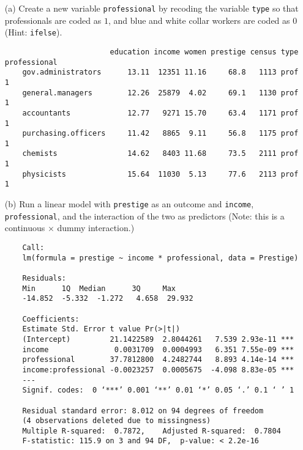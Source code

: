\documentclass[12pt,letterpaper]{article}
\begin{document}
\newpage
\begin{enumerate}
	
	\item [(a)]
	Create a new variable \texttt{professional} by recoding the variable \texttt{type} so that professionals are coded as $1$, and blue and white collar workers are coded as $0$ (Hint: \texttt{ifelse}).
		 
	\begin{verbatim}
	                    education income women prestige census type professional
	gov.administrators      13.11  12351 11.16     68.8   1113 prof            1
	general.managers        12.26  25879  4.02     69.1   1130 prof            1
	accountants             12.77   9271 15.70     63.4   1171 prof            1
	purchasing.officers     11.42   8865  9.11     56.8   1175 prof            1
	chemists                14.62   8403 11.68     73.5   2111 prof            1
	physicists              15.64  11030  5.13     77.6   2113 prof            1
\end{verbatim}  
		\vspace{4cm}
	
	\item [(b)]
	Run a linear model with \texttt{prestige} as an outcome and \texttt{income}, \texttt{professional}, and the interaction of the two as predictors (Note: this is a continuous $\times$ dummy interaction.)
		 
			\vspace{2cm}
		\begin{verbatim}
	Call:
	lm(formula = prestige ~ income * professional, data = Prestige)
	
	Residuals:
	Min      1Q  Median      3Q     Max 
	-14.852  -5.332  -1.272   4.658  29.932 
	
	Coefficients:
	Estimate Std. Error t value Pr(>|t|)    
	(Intercept)         21.1422589  2.8044261   7.539 2.93e-11 ***
	income               0.0031709  0.0004993   6.351 7.55e-09 ***
	professional        37.7812800  4.2482744   8.893 4.14e-14 ***
	income:professional -0.0023257  0.0005675  -4.098 8.83e-05 ***
	---
	Signif. codes:  0 ‘***’ 0.001 ‘**’ 0.01 ‘*’ 0.05 ‘.’ 0.1 ‘ ’ 1
	
	Residual standard error: 8.012 on 94 degrees of freedom
	(4 observations deleted due to missingness)
	Multiple R-squared:  0.7872,	Adjusted R-squared:  0.7804 
	F-statistic: 115.9 on 3 and 94 DF,  p-value: < 2.2e-16
	\end{verbatim}  
	

\end{enumerate}
\end{document}
